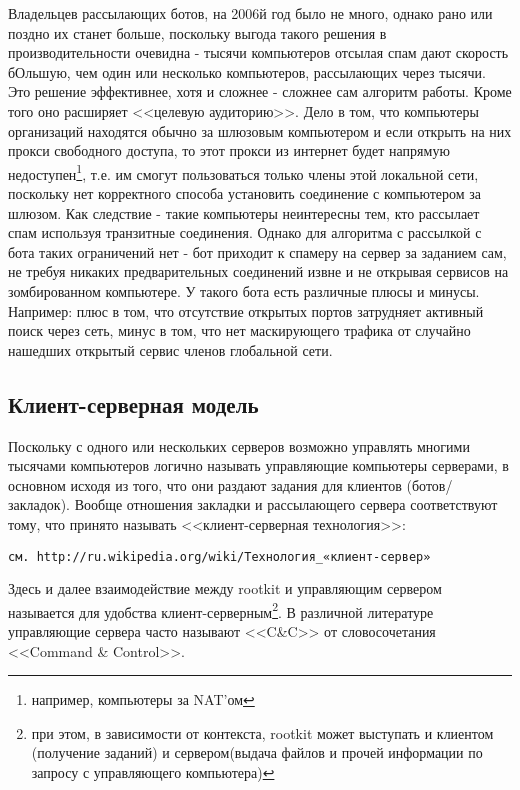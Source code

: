 Владельцев рассылающих ботов, на 2006й год было не много, однако рано
или поздно  их станет больше, поскольку выгода такого решения в
производительности очевидна - тысячи компьютеров  отсылая спам дают
 скорость бОльшую, чем один или несколько
компьютеров, рассылающих через тысячи. Это решение  эффективнее, хотя и
сложнее - сложнее сам алгоритм работы. Кроме того оно расширяет
<<целевую  аудиторию>>. Дело в том, что компьютеры организаций находятся
обычно за шлюзовым компьютером и если открыть  на них прокси свободного
доступа, то этот прокси из интернет будет напрямую
недоступен\footnote{например, компьютеры за NAT'ом}, т.е. им смогут
пользоваться только члены этой локальной сети, поскольку нет корректного
способа установить соединение с компьютером за шлюзом. Как следствие -
такие компьютеры неинтересны тем,  кто рассылает спам используя
транзитные соединения. Однако для алгоритма с рассылкой с бота таких
ограничений нет - бот приходит к спамеру на сервер за заданием сам, не
требуя никаких предварительных соединений извне и не открывая сервисов
на зомбированном компьютере. У такого бота есть различные плюсы и минусы.
Например: плюс в том,  что отсутствие открытых портов затрудняет активный
поиск через сеть, минус в том, что нет маскирующего  трафика от случайно
нашедших открытый сервис членов глобальной сети.

\subsection{Клиент-серверная модель}

Поскольку с одного или нескольких серверов возможно управлять многими
тысячами компьютеров логично называть управляющие компьютеры серверами,
в основном исходя из того, что они раздают задания для клиентов
(ботов/закладок). Вообще отношения закладки и рассылающего сервера
соответствуют тому, что принято называть <<клиент-серверная
технология>>:
\begin{verbatim}
см. http://ru.wikipedia.org/wiki/Технология_«клиент-сервер»
\end{verbatim}

Здесь и далее взаимодействие между rootkit и управляющим сервером называется для
удобства  клиент-серверным\footnote{при этом, в
зависимости от контекста, rootkit может выступать и клиентом (получение
заданий) и сервером(выдача файлов и прочей информации по запросу с
управляющего компьютера)}. В различной литературе управляющие сервера часто
называют <<C\&C>> от словосочетания <<Command \& Control>>.


